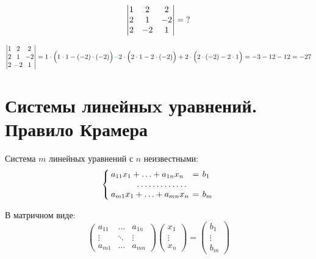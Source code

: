 \documentclass[a4paper,12pt]{article}
\begin{document}
  \begin{problem}[14.7(3)]
    \[
      \begin{vmatrix}
        1 & 2 & 2\\
        2 & 1 & -2\\
        2 & -2 & 1
      \end{vmatrix} = \operatorname{?}
    \]
  \end{problem}
  
  \begin{solution}
    \[
      \begin{vmatrix}
        1 & 2 & 2\\
        2 & 1 & -2\\
        2 & -2 & 1
      \end{vmatrix}
      = 1 \cdot \Bigl(1 \cdot 1 - (-2) \cdot (-2)\Bigr)
        \textcolor{light-cyan}{-} 2 \cdot \Bigl(2 \cdot 1 - 2 \cdot (-2)\Bigr)
        + 2 \cdot \Bigl(2 \cdot (-2) - 2 \cdot 1\Bigr)
      = -3 - 12 - 12
      = -27
    \]
  \end{solution}
  
  
  \section{Системы линейныx уравнений. Правило Крамера}
  
  Система $m$ линейных уравнений с $n$ неизвестными:
  \[
    \renewcommand{\arraycolsep}{2pt}
    \left\{
      \begin{array}{lcl}
        a_{11} x_1 + \ldots + a_{1n} x_n & = & b_1\\
        \hdotsfor{3}\\
        a_{m1} x_1 + \ldots + a_{mn} x_n & = & b_m
      \end{array}
    \right.
  \]
  
  В матричном виде:
  \[
    \begin{pmatrix}
      a_{11} & \ldots & a_{1n}\\
      \vdots & \ddots & \vdots\\
      a_{m1} & \ldots & a_{mn}
    \end{pmatrix}
    \begin{pmatrix}
      x_1\\
      \vdots\\
      x_n
    \end{pmatrix}
    =
    \begin{pmatrix}
      b_1\\
      \vdots\\
      b_m
    \end{pmatrix}
  \]
  
\end{document}
